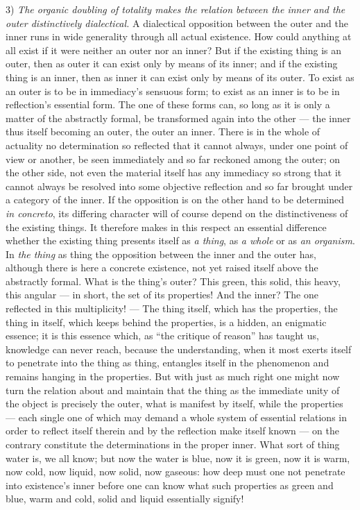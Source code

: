 \documentclass[12pt,a4paper]{book}
\begin{document}
3) \emph{The organic doubling of totality makes the relation between the inner
and the outer distinctively dialectical.}
A dialectical opposition between the outer and the inner runs in wide
generality through all actual existence. How could anything at all exist if it
were neither an outer nor an inner? But if the existing thing is an outer, then
as outer it can exist only by means of its inner; and if the existing thing is
an inner, then as inner it can exist only by means of its outer. To exist as an
outer is to be in immediacy's sensuous form; to exist as an inner is to be in
reflection's essential form. The one of these forms can, so long as it is only
a matter of the abstractly formal, be transformed again into the other --- the
inner thus itself becoming an outer, the outer an inner. There is in the whole
of actuality no determination so reflected that it cannot always, under one
point of view or another, be seen immediately and so far reckoned among the
outer; on the other side, not even the material itself has any immediacy so
strong that it cannot always be resolved into some objective reflection and so
far brought under a category of the inner. If the opposition is on the other
hand to be determined \textit{in concreto}, its differing character will of
course depend on the distinctiveness of the existing things. It therefore makes
in this respect an essential difference whether the existing thing presents
itself as \emph{a thing}, as \emph{a whole} or as \emph{an organism}.
In \emph{the thing} as thing the opposition between the inner and the outer
has, although there is here a concrete existence, not yet raised itself above
the abstractly formal. What is the thing's outer? This green, this solid, this
heavy, this angular --- in short, the set of its properties! And the inner? The
one reflected in this multiplicity! --- The thing itself, which has the
properties, the thing in itself, which keeps behind the properties, is a
hidden, an enigmatic essence; it is this essence which, as ``the critique of
reason'' has taught us, knowledge can never reach, because the understanding,
when it most exerts itself to penetrate into the thing as thing, entangles
itself in the phenomenon and remains hanging in the properties. But with just
as much right one might now turn the relation about and maintain that the thing
as the immediate unity of the object is precisely the outer, what is manifest
by itself, while the properties --- each single one of which may demand a whole
system of essential relations in order to reflect itself therein and by the
reflection make itself known --- on the contrary constitute the determinations
in the proper inner. What sort of thing water is, we all know; but now the
water is blue, now it is green, now it is warm, now cold, now liquid, now
solid, now gaseous: how deep must one not penetrate into existence's inner
before one can know what such properties as green and blue, warm and cold,
solid and liquid essentially signify!
\end{document}
